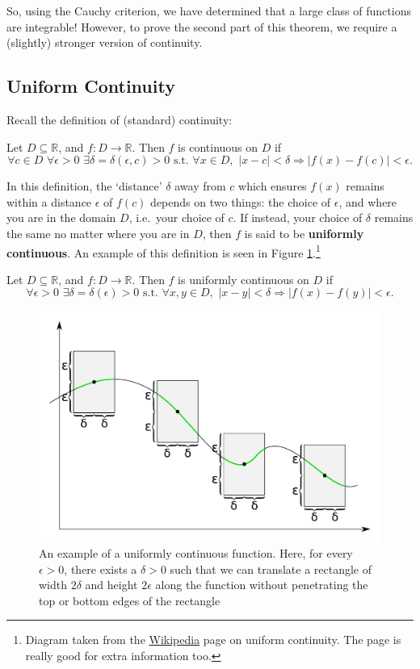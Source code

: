 \documentclass[
  12pt,
  a4paper]{extarticle}
\theoremstyle{plain}
\theoremstyle{definition}
\theoremstyle{plain}
\theoremstyle{plain}
\theoremstyle{plain}
\theoremstyle{plain}
\theoremstyle{definition}
\theoremstyle{definition}
\theoremstyle{remark}
\theoremstyle{remark}
\let\BeginKnitrBlock\begin \let\EndKnitrBlock\end
\renewcommand{\;}{\,}
\begin{document}
So, using the Cauchy criterion, we have determined that a large class of functions are integrable! However, to prove the second part of this theorem, we require a (slightly) stronger version of continuity.

\hypertarget{uniform-continuity}{%
\subsection{Uniform Continuity}\label{uniform-continuity}}

Recall the definition of (standard) continuity:

\BeginKnitrBlock{definition}[Continuity]
{\label{def:def3} }Let \(D \subseteq \mathbb{R}\), and \(f: D \to \mathbb{R}\). Then \(f\) is continuous on \(D\) if \[\forall c \in D\;\;\forall \epsilon > 0\;\;\exists \delta = \delta(\epsilon,c) > 0\;\;\text{s.t.}\;\;\forall x \in D,\;\; \lvert x - c \rvert < \delta \Rightarrow \lvert f(x) - f(c) \rvert < \epsilon.\]
\EndKnitrBlock{definition}

In this definition, the `distance' \(\delta\) away from \(c\) which ensures \(f(x)\) remains within a distance \(\epsilon\) of \(f(c)\) depends on two things: the choice of \(\epsilon\), and where you are in the domain \(D\), i.e.~your choice of \(c\). If instead, your choice of \(\delta\) remains the same no matter where you are in \(D\), then \(f\) is said to be \textbf{uniformly continuous}. An example of this definition is seen in Figure \ref{fig:unicont}.\footnote{Diagram taken from the \href{https://en.wikipedia.org/wiki/Uniform_continuity}{Wikipedia} page on uniform continuity. The page is really good for extra information too.}

\BeginKnitrBlock{definition}[Uniform Continuity]
{\label{def:def4} }Let \(D \subseteq \mathbb{R}\), and \(f: D \to \mathbb{R}\). Then \(f\) is uniformly continuous on \(D\) if \[\forall \epsilon > 0\;\;\exists \delta = \delta(\epsilon) > 0\;\;\text{s.t.}\;\;\forall x,y \in D,\;\; \lvert x - y \rvert < \delta \Rightarrow \lvert f(x) - f(y) \rvert < \epsilon.\]
\EndKnitrBlock{definition}

\begin{figure}

{\centering \includegraphics[width=0.5\linewidth]{UniCont} 

}

\caption{An example of a uniformly continuous function. Here, for every $\epsilon > 0$, there exists a $\delta > 0$ such that we can translate a rectangle of width $2\delta$ and height $2\epsilon$ along the function without penetrating the top or bottom edges of the rectangle}\label{fig:unicont}
\end{figure}
\end{document}
